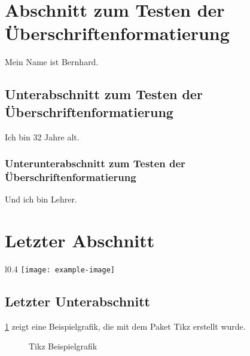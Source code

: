 \clearpage

\section{Abschnitt zum Testen der Überschriftenformatierung}\label{sec:formattest}

Mein Name ist Bernhard.

\subsection{Unterabschnitt zum Testen der Überschriftenformatierung}\label{subsec:formattest}

Ich bin 32 Jahre alt.

\subsubsection{Unterunterabschnitt zum Testen der Überschriftenformatierung}\label{subsubsec:formattest}

Und ich bin Lehrer.

\clearpage

\section{Letzter Abschnitt}\label{sec:last}

\lipsum[6]

\begin{wrapfigure}{l}{0.4\textwidth}
    \centering
    \texttt{[image: example-image]}
    \captionsetup{width=0.9\linewidth}
    \caption[Beispielabbildung mit Text umrandet]{Beispielabbildung mit Text umrandet (eigene Abbildung)}
    \label{fig:textwrappedaroundexampleimage}
\end{wrapfigure}

\lipsum[7-9]

\clearpage

\subsection{Letzter Unterabschnitt}\label{subsec:last}

\cref{fig:tikzexamplegraphics} zeigt eine Beispielgrafik, die mit dem Paket \glqq Tikz\grqq{} erstellt wurde.

\begin{figure}[!ht]
    \centering
    \caption{Tikz Beispielgrafik}
    \label{fig:tikzexamplegraphics}
\end{figure}

